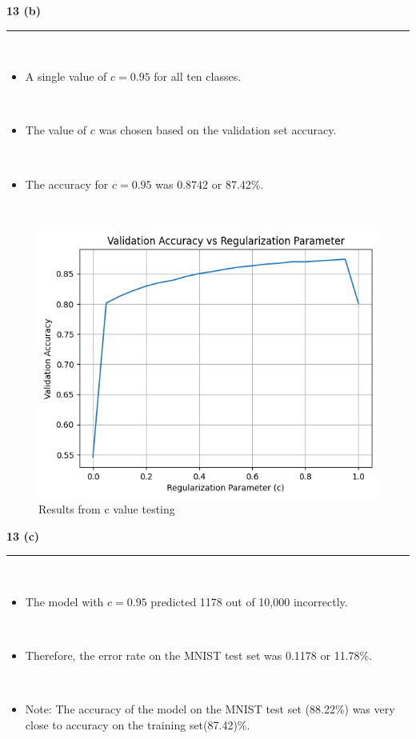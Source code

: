 \documentclass{article}
\begin{document}
\newpage
\parbox{\textwidth}{\textbf{13 (b)}}
\noindent\rule{\textwidth}{0.4pt}\\
\begin{itemize}
    \item \parbox{\textwidth}{A single value of $c=0.95$ for all ten classes.}\\
    \item \parbox{\textwidth}{The value of $c$ was chosen based on the validation set accuracy.}\\
    \item \parbox{\textwidth}{The accuracy for $c=0.95$ was $0.8742$ or 87.42\%.}\\
\end{itemize}

\begin{figure}[H]
\includegraphics[width=1\textwidth]{hw3_13b.png} 
\caption{Results from c value testing}
\end{figure}

\newpage
\parbox{\textwidth}{\textbf{13 (c)}}
\noindent\rule{\textwidth}{0.4pt}\\
\begin{itemize}
    \item \parbox{\textwidth}{The model with $c=0.95$ predicted 1178 out of 10,000 incorrectly.}\\
    \item \parbox{\textwidth}{Therefore, the error rate on the MNIST test set was 0.1178 or 11.78\%.}\\
    \item \parbox{\textwidth}{Note: The accuracy of the model on the MNIST test set (88.22\%) was very close to accuracy on the training set(87.42)\%.}\\
\end{itemize}
\end{document}
